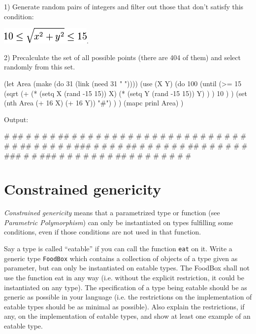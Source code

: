 1) Generate random pairs of integers and filter out those that don't
satisfy this condition:

\includegraphics[scale=.6]{graphics/d8c852f6bb73b0d042422df261390347.png}.

2) Precalculate the set of all possible points (there are 404 of them)
and select randomly from this set.


\begin{wideverbatim}

(let Area (make (do 31 (link (need 31 " "))))
   (use (X Y)
      (do 100
         (until
            (>=
               15
               (sqrt
                  (+
                     (* (setq X (rand -15 15)) X)
                     (* (setq Y (rand -15 15)) Y) ) )
               10 ) )
         (set (nth Area (+ 16 X) (+ 16 Y)) "#") ) )
   (mapc prinl Area) )

Output:

           #
        ##
           #  #  #  #
         ## #    #  #   #
       #      #   # # #
    #       #     # #   #
      #   #         #    #
      #                #   #
                       #
       #               #
     ##                      #
                          #
   #                      # #
  ###                      #
 #                         # #
##                          # #
  #                        #
 #                        #
 ## #
                           #
   #
     #                 #
     #
   ###                  #   #
      ###           # #    #
    #      #
         #  #   ##
                 # #
      #     #           #
                # #  #

\end{wideverbatim}

\pagebreak{}
\section*{Constrained genericity}

\emph{Constrained genericity} means that a parametrized type or
function (see \emph{Parametric Polymorphism}) can only be instantiated
on types fulfilling some conditions, even if those conditions are not
used in that function.

Say a type is called ``eatable'' if you can call the function
\texttt{eat} on it. Write a generic type \texttt{FoodBox} which contains
a collection of objects of a type given as parameter, but can only be
instantiated on eatable types. The FoodBox shall not use the function
eat in any way (i.e. without the explicit restriction, it could be
instantiated on any type). The specification of a type being eatable
should be as generic as possible in your language (i.e. the restrictions
on the implementation of eatable types should be as minimal as
possible). Also explain the restrictions, if any, on the implementation
of eatable types, and show at least one example of an eatable type.



